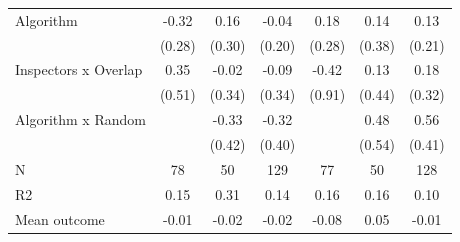\begin{tabular}{lccc|ccc}
Algorithm   &       -0.32         &        0.16         &       -0.04         &        0.18         &        0.14         &        0.13         \\
            &      (0.28)         &      (0.30)         &      (0.20)         &      (0.28)         &      (0.38)         &      (0.21)         \\
\addlinespace
Inspectors x Overlap&        0.35         &       -0.02         &       -0.09         &       -0.42         &        0.13         &        0.18         \\
            &      (0.51)         &      (0.34)         &      (0.34)         &      (0.91)         &      (0.44)         &      (0.32)         \\
\addlinespace
Algorithm x Random&                     &       -0.33         &       -0.32         &                     &        0.48         &        0.56         \\
            &                     &      (0.42)         &      (0.40)         &                     &      (0.54)         &      (0.41)         \\
\midrule
N           &          78         &          50         &         129         &          77         &          50         &         128         \\
R2          &        0.15         &        0.31         &        0.14         &        0.16         &        0.16         &        0.10         \\
Mean outcome&       -0.01         &       -0.02         &       -0.02         &       -0.08         &        0.05         &       -0.01         \\
\bottomrule \end{tabular}
